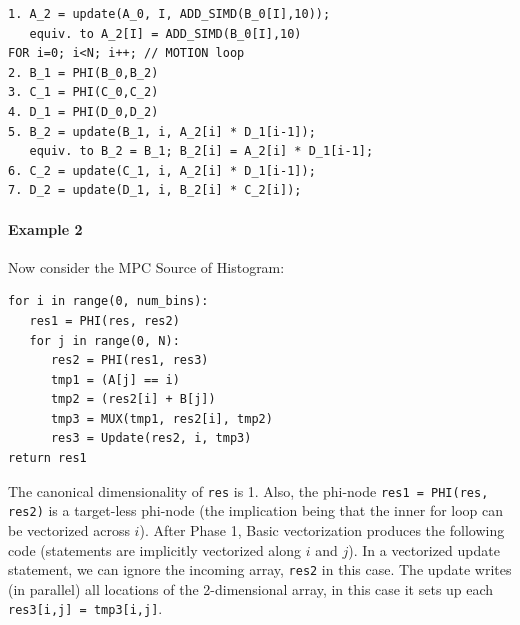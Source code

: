\documentclass[sigconf, screen, natbib=false, dvipsnames, table]{acmart}
\theoremstyle{definition}
\begin{document}
{\small
\begin{verbatim}
1. A_2 = update(A_0, I, ADD_SIMD(B_0[I],10));
   equiv. to A_2[I] = ADD_SIMD(B_0[I],10)
FOR i=0; i<N; i++; // MOTION loop
2. B_1 = PHI(B_0,B_2)
3. C_1 = PHI(C_0,C_2)
4. D_1 = PHI(D_0,D_2)
5. B_2 = update(B_1, i, A_2[i] * D_1[i-1]);
   equiv. to B_2 = B_1; B_2[i] = A_2[i] * D_1[i-1];
6. C_2 = update(C_1, i, A_2[i] * D_1[i-1]);
7. D_2 = update(D_1, i, B_2[i] * C_2[i]);
\end{verbatim}
}

\paragraph{Example 2} Now consider the MPC Source of Histogram:

{\small
\begin{verbatim}
for i in range(0, num_bins):
   res1 = PHI(res, res2)
   for j in range(0, N):
      res2 = PHI(res1, res3)
      tmp1 = (A[j] == i)
      tmp2 = (res2[i] + B[j])
      tmp3 = MUX(tmp1, res2[i], tmp2)
      res3 = Update(res2, i, tmp3)     
return res1
\end{verbatim}
}

The canonical dimensionality of \texttt{res} is 1. Also, the phi-node \texttt{res1 = PHI(res, res2)} is a target-less phi-node (the implication being that the inner for loop can be vectorized across $i$). After Phase 1, Basic vectorization produces the following code (statements are implicitly vectorized along $i$ and $j$). In a vectorized update statement, we can ignore the incoming array, \texttt{res2} in this case. The update writes (in parallel) all locations of the 2-dimensional array, in this case it sets up each \texttt{res3[i,j] = tmp3[i,j]}.
\end{document}
